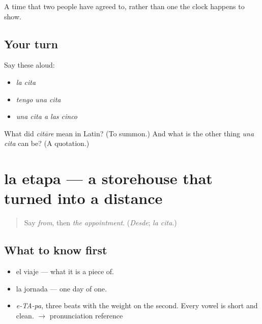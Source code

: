\begin{grammarlens}[title={What you've built}]
A time that two people have agreed to, rather than one the clock happens to show.
\end{grammarlens}

\subsection*{Your turn}
Say these aloud:

\begin{itemize}
\raggedright
  \item \emph{la cita}
  \item \emph{tengo una cita}
  \item \emph{una cita a las cinco}
\end{itemize}

\begin{tcolorbox}[breakable,colback=teal!4,colframe=teal!35!black,title={Before you move on}]
What did \emph{citāre} mean in Latin? (To summon.) And what is the other thing \emph{una cita} can be? (A quotation.)
\end{tcolorbox}
\section[la etapa]{la etapa — a storehouse that turned into a distance}

\label{lesson:ES-C356-etapa}



\begin{quote}
Say \emph{from}, then \emph{the appointment}. (\emph{Desde}; \emph{la cita}.)
\end{quote}

\subsection*{What to know first}
\begin{itemize}
\raggedright
  \item el viaje — what it is a piece of.
  \item la jornada — one day of one.
\end{itemize}

\begin{sounds}
\begin{itemize}
\raggedright
  \item \emph{e-TA-pa}, three beats with the weight on the second. Every vowel is short and clean. $\to$ pronunciation reference
\end{itemize}
\end{sounds}

